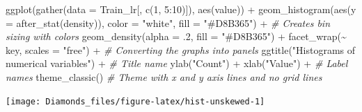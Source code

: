 \documentclass[
]{article}
\newenvironment{Shaded}{\begin{snugshade}}{\end{snugshade}}
\newcommand{\AttributeTok}[1]{\textcolor[rgb]{0.77,0.63,0.00}{#1}}
\newcommand{\CommentTok}[1]{\textcolor[rgb]{0.56,0.35,0.01}{\textit{#1}}}
\newcommand{\DecValTok}[1]{\textcolor[rgb]{0.00,0.00,0.81}{#1}}
\newcommand{\FunctionTok}[1]{\textcolor[rgb]{0.00,0.00,0.00}{#1}}
\newcommand{\NormalTok}[1]{#1}
\newcommand{\OtherTok}[1]{\textcolor[rgb]{0.56,0.35,0.01}{#1}}
\newcommand{\SpecialCharTok}[1]{\textcolor[rgb]{0.00,0.00,0.00}{#1}}
\newcommand{\StringTok}[1]{\textcolor[rgb]{0.31,0.60,0.02}{#1}}
\begin{document}
\begin{Shaded}
\end{Shaded}

\begin{Shaded}
\begin{Highlighting}[]
\FunctionTok{ggplot}\NormalTok{(}\FunctionTok{gather}\NormalTok{(}\AttributeTok{data =}\NormalTok{ Train\_lr[, }\FunctionTok{c}\NormalTok{(}\DecValTok{1}\NormalTok{, }\DecValTok{5}\SpecialCharTok{:}\DecValTok{10}\NormalTok{)]), }\FunctionTok{aes}\NormalTok{(value)) }\SpecialCharTok{+}
  \FunctionTok{geom\_histogram}\NormalTok{(}\FunctionTok{aes}\NormalTok{(}\AttributeTok{y =} \FunctionTok{after\_stat}\NormalTok{(density)),}
                 \AttributeTok{color =} \StringTok{"white"}\NormalTok{,}
                 \AttributeTok{fill =} \StringTok{"\#D8B365"}\NormalTok{) }\SpecialCharTok{+}             \CommentTok{\# Creates bin sizing with colors}
  \FunctionTok{geom\_density}\NormalTok{(}\AttributeTok{alpha =}\NormalTok{ .}\DecValTok{2}\NormalTok{, }\AttributeTok{fill =} \StringTok{"\#D8B365"}\NormalTok{) }\SpecialCharTok{+}
  \FunctionTok{facet\_wrap}\NormalTok{(}\SpecialCharTok{\textasciitilde{}}\NormalTok{ key, }\AttributeTok{scales =} \StringTok{"free"}\NormalTok{) }\SpecialCharTok{+}           \CommentTok{\# Converting the graphs into panels}
  \FunctionTok{ggtitle}\NormalTok{(}\StringTok{"Histograms of numerical variables"}\NormalTok{) }\SpecialCharTok{+} \CommentTok{\# Title name}
  \FunctionTok{ylab}\NormalTok{(}\StringTok{"Count"}\NormalTok{) }\SpecialCharTok{+} \FunctionTok{xlab}\NormalTok{(}\StringTok{"Value"}\NormalTok{) }\SpecialCharTok{+}                \CommentTok{\# Label names}
  \FunctionTok{theme\_classic}\NormalTok{()                                }\CommentTok{\# Theme with x and y axis lines and no grid lines}
\end{Highlighting}
\end{Shaded}

\begin{center}\texttt{[image: Diamonds\_files/figure-latex/hist-unskewed-1]} \end{center}
\end{document}
